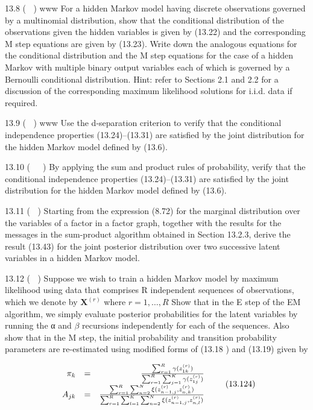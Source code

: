 \documentclass[
  10
]{article}
\begin{document}
13.8 ( ) www For a hidden Markov model having discrete observations
governed by a multinomial distribution, show that the conditional
distribution of the observations given the hidden variables is given by
(13.22) and the corresponding M step equations are given by (13.23).
Write down the analogous equations for the conditional distribution and
the M step equations for the case of a hidden Markov with multiple
binary output variables each of which is governed by a Bernoulli
conditional distribution. Hint: refer to Sections 2.1 and 2.2 for a
discussion of the corresponding maximum likelihood solutions for i.i.d.
data if required.

13.9 ( ) www Use the d-separation criterion to verify that the
conditional independence properties (13.24)--(13.31) are satisfied by
the joint distribution for the hidden Markov model defined by (13.6).

13.10 (  ) By applying the sum and product rules of probability, verify
that the conditional independence properties (13.24)--(13.31) are
satisfied by the joint distribution for the hidden Markov model defined
by (13.6).

13.11 ( ) Starting from the expression (8.72) for the marginal
distribution over the variables of a factor in a factor graph, together
with the results for the messages in the sum-product algorithm obtained
in Section 13.2.3, derive the result (13.43) for the joint posterior
distribution over two successive latent variables in a hidden Markov
model.

13.12 ( ) Suppose we wish to train a hidden Markov model by maximum
likelihood using data that comprises R independent sequences of
observations, which we denote by \(\mathbf { X } ^ { ( r ) }\) where
\(r = 1 , \ldots , R\) Show that in the E step of the EM algorithm, we
simply evaluate posterior probabilities for the latent variables by
running the α and \(\beta\) recursions independently for each of the
sequences. Also show that in the M step, the initial probability and
transition probability parameters are re-estimated using modified forms
of (13.18 ) and (13.19) given by

\[
\begin{array}{r l r} \pi_ {k} & = & \frac {\sum_ {r = 1} ^ {R} \gamma (z _ {1 k} ^ {(r)})}{\sum_ {r = 1} ^ {R} \sum_ {j = 1} ^ {K} \gamma (z _ {1 j} ^ {(r)})} \\ A _ {j k} & = & \frac {\sum_ {r = 1} ^ {R} \sum_ {n = 2} ^ {N} \xi (z _ {n - 1 , j} ^ {(r)} , z _ {n , k} ^ {(r)})}{\sum_ {r = 1} ^ {R} \sum_ {l = 1} ^ {K} \sum_ {n = 2} ^ {N} \xi (z _ {n - 1 , j} ^ {(r)} , z _ {n , l} ^ {(r)})} \end{array}\tag{13.124}
\]
\end{document}
